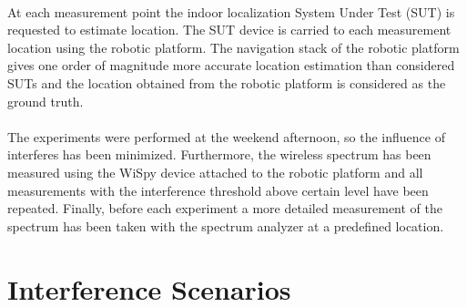 \documentclass[11pt,a4paper,headinclude,footinclude,chapterprefix=on]{scrreprt}
\begin{document}
\paragraph{} At each measurement point the indoor localization System Under Test (SUT) is requested to estimate location. The SUT device is carried to each measurement location using the robotic platform. The navigation stack of the robotic platform gives one order of magnitude more accurate location estimation than considered SUTs and the location obtained from the robotic platform is considered as the ground truth.

\paragraph{} The experiments were performed at the weekend afternoon, so the influence of interferes has been minimized. Furthermore, the wireless spectrum has been measured using the WiSpy device attached to the robotic platform and all measurements with the interference threshold above certain level have been repeated. Finally, before each experiment a more detailed measurement of the spectrum has been taken with the spectrum analyzer at a predefined location.

\section{Interference Scenarios}\label{sec:interference}
\end{document}
